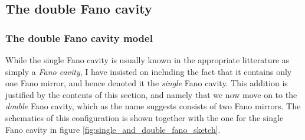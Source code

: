 \subsection{The double Fano cavity}

\subsubsection{The double Fano cavity model}

While the single Fano cavity is usually known in the appropriate litterature as simply a \emph{Fano cavity}, I have insisted on including the fact that it contains only one Fano mirror, and hence denoted it the \emph{single} Fano cavity. This addition is justified by the contents of this section, and namely that we now move on to the \emph{double} Fano cavity, which as the name suggests consists of two Fano mirrors. The schematics of this configuration is shown together with the one for the single Fano cavity in figure \ref{fig:single_and_double_fano_sketch}.

